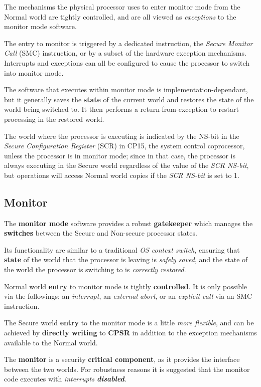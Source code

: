 The mechanisms the physical processor uses to enter monitor mode from
the Normal world are tightly controlled, and are all viewed as \textit{exceptions} to
the monitor mode software.

The entry to monitor is triggered by a dedicated instruction, 
the \textit{Secure Monitor Call} (SMC) instruction, or by a subset of the hardware exception
mechanisms.
Interrupts and exceptions can all be configured to cause the processor to switch into monitor mode.

The software that executes within monitor mode is implementation-dependant,
but it generally saves the \textbf{state} of the current world and restores the state of the world being switched to.
It then performs a return-from-exception to restart processing in the restored world.

The world where the processor is executing is indicated by the NS-bit in the \textit{Secure Configuration Register} (SCR) in
CP15, the system control coprocessor, unless the processor is in monitor mode;
since in that case, the processor is always executing in the Secure world regardless of the value of the \textit{SCR NS-bit},
but operations will access Normal world copies if the \textit{SCR NS-bit} is set to 1.

\subsection{Monitor}

The \textbf{monitor mode} software provides a robust \textbf{gatekeeper} which manages the
\textbf{switches} between the Secure and Non-secure processor states.

Its functionality are similar to a traditional \textit{OS context switch}, ensuring that \textbf{state} of
the world that the processor is leaving is \textit{safely saved}, and the state of the world
the processor is switching to is \textit{correctly restored}.

Normal world \textbf{entry} to monitor mode is tightly \textbf{controlled}.
It is only possible via the
followings: an \textit{interrupt}, an \textit{external abort}, or an \textit{explicit call} via an SMC instruction.

The Secure world \textbf{entry} to the monitor mode is a little \textit{more flexible}, and can be
achieved by \textbf{directly writing} to \textbf{CPSR} in addition to the exception mechanisms
available to the Normal world.

The \textbf{monitor} is a security \textbf{critical component}, as it provides the interface between
the two worlds.
For robustness reasons it is suggested that the monitor code executes with \textit{interrupts \textbf{disabled}}.

